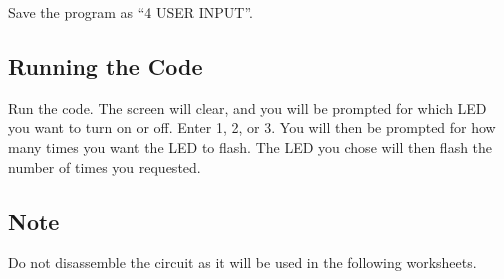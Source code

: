 Save the program as ``4 USER INPUT''.

\subsection*{Running the Code}

Run the code.  The screen will clear, and you will be prompted for which LED you want to turn on or off.  Enter 1, 2, or 3.  You will then be prompted for how many times you want the LED to flash.  The LED you chose will then flash the number of times you requested.

\subsection*{Note}

Do not disassemble the circuit as it will be used in the following worksheets.
